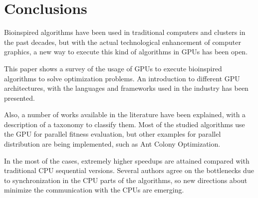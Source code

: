 \documentclass[prodmode,acmtecs]{acmsmall}
\begin{document}

\section{Conclusions}
\label{sec:conclusions}

Bioinspired algorithms have been used in traditional computers and clusters in 
the past decades, but with the actual technological enhancement of computer graphics, a new way to execute this kind of algorithms in GPUs has been open. 

This paper shows a survey of the usage of GPUs to execute bioinspired
algorithms to solve optimization problems. An introduction to different GPU architectures, with the languages and frameworks used in the industry has been presented.

Also, a number of works available in the literature have been explained, with a description of a taxonomy to classify them. Most of the studied algorithms use the GPU for parallel fitness evaluation, but other examples for parallel distribution are being implemented, such as Ant Colony Optimization.

In the most of the cases, extremely higher speedups are attained compared with traditional CPU sequential versions. Several authors agree on the bottlenecks due to synchronization in the CPU parts of the algorithms, so new directions 
about minimize the communication with the CPUs are emerging.
\end{document}

